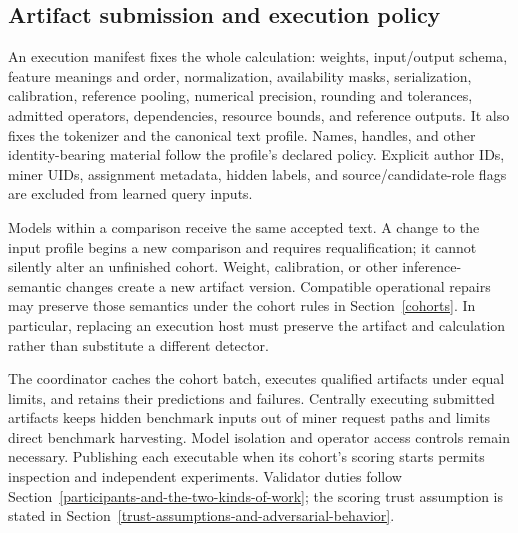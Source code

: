 \subsection{Artifact submission and execution policy}\label{a-artifact-execution}

An execution manifest fixes the whole calculation: weights, input/output
schema, feature meanings and order, normalization, availability masks,
serialization, calibration, reference pooling, numerical precision, rounding
and tolerances, admitted operators, dependencies, resource bounds, and
reference outputs. It also fixes the tokenizer and the canonical text profile.
Names, handles, and other identity-bearing material follow the profile's
declared policy. Explicit author IDs, miner UIDs,
assignment metadata, hidden labels, and source/candidate-role flags are
excluded from learned query inputs.

Models within a comparison receive the same accepted text. A change to the
input profile begins a new comparison and requires requalification;
it cannot silently alter an unfinished cohort. Weight, calibration, or other
inference-semantic changes create a new artifact version. Compatible
operational repairs may preserve those semantics under the cohort rules in
Section~\ref{cohorts}. In particular, replacing an execution host must preserve
the artifact and calculation rather than substitute a different detector.

The coordinator caches the cohort batch, executes qualified artifacts under
equal limits, and retains their predictions and failures. Centrally executing
submitted artifacts keeps hidden benchmark inputs out of miner request paths
and limits direct benchmark harvesting. Model isolation and operator access
controls remain necessary. Publishing each executable when its cohort's scoring
starts permits inspection and independent experiments.
Validator duties follow Section~\ref{participants-and-the-two-kinds-of-work};
the scoring trust assumption is stated in
Section~\ref{trust-assumptions-and-adversarial-behavior}.

